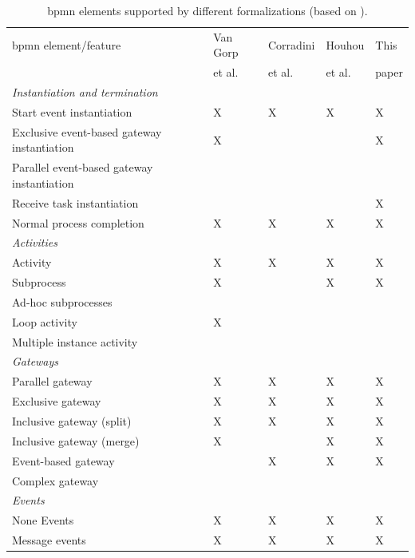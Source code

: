 \documentclass[runningheads]{llncs}
\begin{document}
\begin{table}[htbp]
    \caption{\gls*{bpmn} elements supported by different formalizations (based on \cite{vangorpVisualTokenbasedFormalization2013}).}
    \label{tab:supportedelements}
    \begin{threeparttable}
    \begin{tabular}{l l l l l}
    \hline
      \gls*{bpmn} element/feature & Van Gorp &  Corradini & Houhou & This\\
      & et al. \cite{vangorpVisualTokenbasedFormalization2013} & et al. \cite{corradiniFormalApproachAnalysis2021}& et al. \cite{houhouFirstOrderLogicVerification2022} & paper\\
      \hline
      \textit{Instantiation and termination} & &\\
      Start event instantiation & X & X & X & X\\
      Exclusive event-based gateway instantiation & X & & & X\\
      Parallel event-based gateway instantiation &  & & & \\
      Receive task instantiation & & & & X\\
      Normal process completion & X & X & X & X\\
      \textit{Activities} & & & &\\
      Activity & X & X & X & X\\
      Subprocess & X & & X & X\\
      Ad-hoc subprocesses & & & &\\
      Loop activity & X & & &\\
      Multiple instance activity & & & & \\
      \textit{Gateways} & & & &\\
      Parallel gateway & X & X & X & X\\
      Exclusive gateway & X & X & X & X\\
      Inclusive gateway (split) & X & X & X & X\\
      Inclusive gateway (merge) & X & & X & X\\
      Event-based gateway &  & X\tnote{1} & X & X\\ %
      Complex gateway & & & &\\
      \textit{Events} & & & & \\
      None Events & X & X & X & X\\
      Message events & X & X & X & X\\

\end{tabular}
\end{threeparttable}
\end{table}
\end{document}
